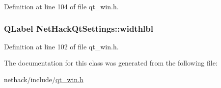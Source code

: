 Definition at line 104 of file qt\+\_\+win.\+h.

\hypertarget{classNetHackQtSettings_a378b10ecfb03608b7a59c5f1b53648e8}{
\subsubsection[{widthlbl}]{\setlength{\rightskip}{0pt plus 5cm}Q\+Label Net\+Hack\+Qt\+Settings\+::widthlbl\hspace{0.3cm}{\ttfamily [private]}}}\label{classNetHackQtSettings_a378b10ecfb03608b7a59c5f1b53648e8}


Definition at line 102 of file qt\+\_\+win.\+h.



The documentation for this class was generated from the following file\+:\begin{DoxyCompactItemize}
\item 
nethack/include/\hyperlink{qt__win_8h}{qt\+\_\+win.\+h}\end{DoxyCompactItemize}

